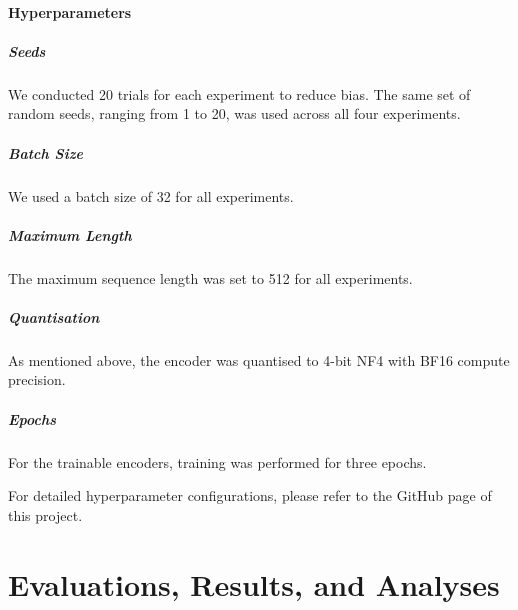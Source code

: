 \documentclass[12pt]{article}
\begin{document}
\paragraph{Hyperparameters}

\subparagraph{Seeds}
We conducted 20 trials for each experiment to reduce bias. 
The same set of random seeds, ranging from 1 to 20, was used across all four experiments.

\subparagraph{Batch Size}
We used a batch size of 32 for all experiments.

\subparagraph{Maximum Length}
The maximum sequence length was set to 512 for all experiments.

\subparagraph{Quantisation}
As mentioned above, the encoder was quantised to 4-bit NF4 with BF16 compute precision.

\subparagraph{Epochs}
For the trainable encoders, training was performed for three epochs.

For detailed hyperparameter configurations, please refer to the GitHub page of this project.



\section{Evaluations, Results, and Analyses}
\end{document}
